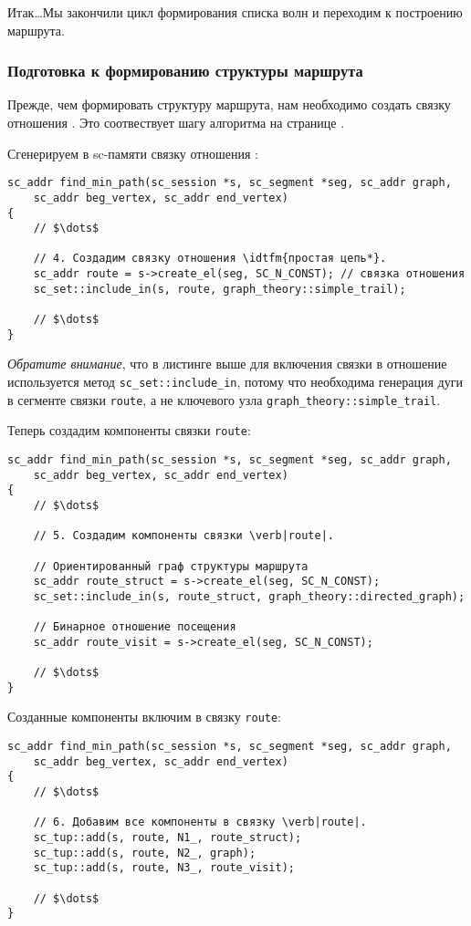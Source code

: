Итак\dots Мы закончили цикл формирования списка волн и переходим к
построению маршрута.

\subsubsection{Подготовка к формированию структуры маршрута}
\label{sec:libscprg_fmp_before_build_route}

Прежде, чем формировать структуру маршрута, нам необходимо создать
связку отношения . Это соотвествует шагу алгоритма
на странице \pageref{astep:S8_Create_route_tuple}.

Сгенерируем в sc-памяти связку отношения :
\begin{lstlisting}[texcl]
sc_addr find_min_path(sc_session *s, sc_segment *seg, sc_addr graph,
    sc_addr beg_vertex, sc_addr end_vertex)
{
    // $\dots$

    // 4. Создадим связку отношения \idtfm{простая цепь*}.
    sc_addr route = s->create_el(seg, SC_N_CONST); // связка отношения
    sc_set::include_in(s, route, graph_theory::simple_trail);

    // $\dots$
}
\end{lstlisting}

\emph{Обратите внимание}, что в листинге выше для включения связки в
отношение используется метод \lstinline|sc_set::include_in|, потому
что необходима генерация дуги в сегменте связки \lstinline|route|, а
не ключевого узла \lstinline|graph_theory::simple_trail|.

Теперь создадим компоненты связки \lstinline|route|:
\begin{lstlisting}[texcl]
sc_addr find_min_path(sc_session *s, sc_segment *seg, sc_addr graph,
    sc_addr beg_vertex, sc_addr end_vertex)
{
    // $\dots$

    // 5. Создадим компоненты связки \verb|route|.
    
    // Ориентированный граф структуры маршрута
    sc_addr route_struct = s->create_el(seg, SC_N_CONST);
    sc_set::include_in(s, route_struct, graph_theory::directed_graph);
    
    // Бинарное отношение посещения
    sc_addr route_visit = s->create_el(seg, SC_N_CONST);

    // $\dots$
}
\end{lstlisting}

Созданные компоненты включим в связку \lstinline|route|:
\begin{lstlisting}[texcl]
sc_addr find_min_path(sc_session *s, sc_segment *seg, sc_addr graph,
    sc_addr beg_vertex, sc_addr end_vertex)
{
    // $\dots$

    // 6. Добавим все компоненты в связку \verb|route|.
    sc_tup::add(s, route, N1_, route_struct);
    sc_tup::add(s, route, N2_, graph);
    sc_tup::add(s, route, N3_, route_visit);

    // $\dots$
}
\end{lstlisting}

